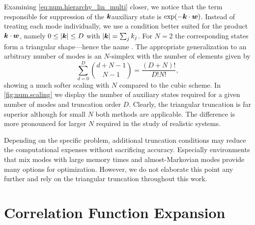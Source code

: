 Examining \autoref{eq:num.hierarchy_lin_multi} closer, we notice that the term responsible for suppression of the $\boldsymbol{k}$\th auxiliary state is $\exp(-\kk \cdot \ww)$.
Instead of treating each mode individually, we use a condition better suited for the product $\boldsymbol{k}\cdot\boldsymbol{w}$, namely $0 \le \vert \boldsymbol{k} \vert \le D$ with $\vert \boldsymbol{k} \vert = \sum_j k_j$.
For $N=2$ the corresponding states form a triangular shape---hence the name .
The appropriate generalization to an arbitrary number of modes is an $N$-simplex with the number of elements given by
\begin{equation}
  \sum_{d=0}^D {d + N - 1 \choose N - 1} = \frac{(D + N)!}{D!N!},
  \label{eq:num.triangular_scaling}
\end{equation}
showing a much softer scaling with $N$ compared to the cubic scheme.
In \autoref{fig:num.scaling} we display the number of auxiliary states required for a given number of modes and truncation order $D$.
Clearly, the triangular truncation is far superior although for small $N$ both methods are applicable.
The difference is more pronounced for larger $N$ required in the study of realistic systems.

Depending on the specific problem, additional truncation conditions may reduce the computational expenses without sacrificing accuracy.
Especially environments that mix modes with large memory times and almost-Markovian modes provide many options for optimization.
However, we do not elaborate this point any further and rely on the triangular truncation throughout this work.

\section{Correlation Function Expansion}
\label{sec:num.expansion}
%


